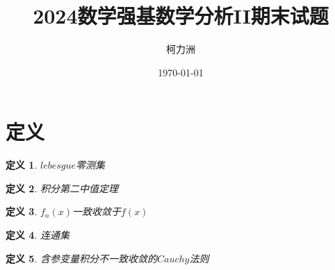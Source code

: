 \documentclass[12pt,a4paper]{article}
\newtheorem{definition}{定义}
\begin{document}
	
	\title{2024数学强基数学分析II期末试题}
	\author{柯力洲}
	\date{\today}
	
	\maketitle
	
	\section*{定义}
	\begin{definition}
		$lebesgue$零测集
	\end{definition}
	
	\begin{definition}
	积分第二中值定理
	\end{definition}
	
		\begin{definition}
	$f_n(x)$一致收敛于$f(x)$
	\end{definition}

		\begin{definition}
	连通集
	\end{definition}
	
	\begin{definition}
		含参变量积分不一致收敛的$Cauchy$法则
	\end{definition}
	
	
	
\end{document}
